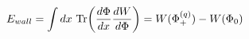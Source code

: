 \begin{equation}
E_{wall} = 
  \int dx ~ {\rm Tr} \biggl ( 
  {{d\Phi}\over {dx}} {{dW}\over {d\Phi}} \biggr ) 
=  W(\Phi_+^{(q)}) - W (\Phi_0)  
\label{susywallenergy}
\end{equation}

